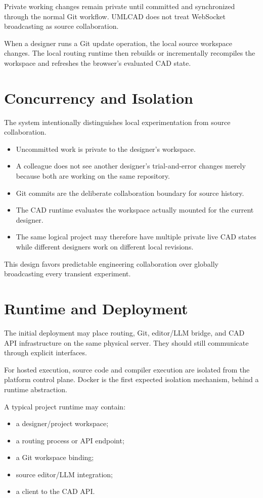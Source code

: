 \documentclass[11pt,a4paper]{article}
\begin{document}
Private working changes remain private until committed and synchronized through the normal Git workflow. UMLCAD does not treat WebSocket broadcasting as source collaboration.

When a designer runs a Git update operation, the local source workspace changes. The local routing runtime then rebuilds or incrementally recompiles the workspace and refreshes the browser's evaluated CAD state.

\section{Concurrency and Isolation}

The system intentionally distinguishes local experimentation from source collaboration.

\begin{itemize}
    \item Uncommitted work is private to the designer's workspace.
    \item A colleague does not see another designer's trial-and-error changes merely because both are working on the same repository.
    \item Git commits are the deliberate collaboration boundary for source history.
    \item The CAD runtime evaluates the workspace actually mounted for the current designer.
    \item The same logical project may therefore have multiple private live CAD states while different designers work on different local revisions.
\end{itemize}

This design favors predictable engineering collaboration over globally broadcasting every transient experiment.

\section{Runtime and Deployment}

The initial deployment may place routing, Git, editor/LLM bridge, and CAD API infrastructure on the same physical server. They should still communicate through explicit interfaces.

For hosted execution, source code and compiler execution are isolated from the platform control plane. Docker is the first expected isolation mechanism, behind a runtime abstraction.

A typical project runtime may contain:
\begin{itemize}
    \item a designer/project workspace;
    \item a routing process or API endpoint;
    \item a Git workspace binding;
    \item source editor/LLM integration;
    \item a client to the CAD API.
\end{itemize}
\end{document}
